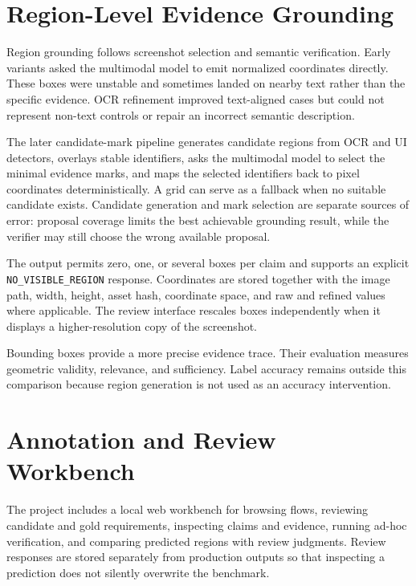 \section{Region-Level Evidence Grounding}\label{region-level-evidence-grounding}

Region grounding follows screenshot selection and semantic verification. Early
variants asked the multimodal model to emit normalized coordinates directly.
These boxes were unstable and sometimes landed on nearby text rather than the
specific evidence. OCR refinement improved text-aligned cases but could not
represent non-text controls or repair an incorrect semantic description.

The later candidate-mark pipeline generates candidate regions from OCR and UI
detectors, overlays stable identifiers, asks the multimodal model to select the
minimal evidence marks, and maps the selected identifiers back to pixel
coordinates deterministically. A grid can serve as a fallback when no suitable
candidate exists. Candidate generation and mark selection are separate sources
of error: proposal coverage limits the best achievable grounding result, while
the verifier may still choose the wrong available proposal.

The output permits zero, one, or several boxes per claim and supports an
explicit \texttt{NO\_\allowbreak VISIBLE\_\allowbreak REGION} response. Coordinates are stored together with the
image path, width, height, asset hash, coordinate space, and raw and refined
values where applicable. The review interface rescales boxes independently when
it displays a higher-resolution copy of the screenshot.

Bounding boxes provide a more precise evidence trace. Their evaluation measures
geometric validity, relevance, and sufficiency. Label accuracy remains outside
this comparison because region generation is not used as an accuracy
intervention.

\section{Annotation and Review Workbench}\label{annotation-and-review-workbench}

The project includes a local web workbench for browsing flows, reviewing
candidate and gold requirements, inspecting claims and evidence, running ad-hoc
verification, and comparing predicted regions with review judgments. Review
responses are stored separately from production outputs so that inspecting a
prediction does not silently overwrite the benchmark.

